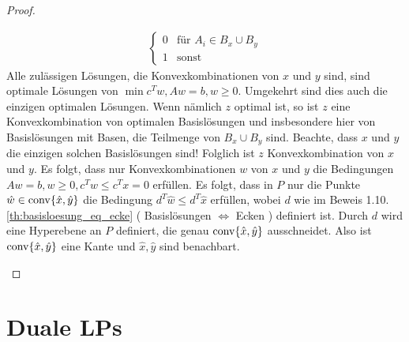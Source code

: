 \begin{proof}
\begin{description}
\begin{align*}
\begin{cases}
0 & \text{für } A_i \in B_x \cup B_y\\
1 & \text{sonst}
\end{cases}
\end{align*} 
Alle zulässigen Lösungen, die Konvexkombinationen von $x$ und $y$ sind, sind optimale Lösungen von $\min c^Tw, Aw=b, w\geq 0$. Umgekehrt sind dies auch die einzigen optimalen Lösungen.
Wenn nämlich $z$ optimal ist, so ist $z$ eine Konvexkombination von optimalen Basislösungen und insbesondere hier von Basislösungen mit Basen, die Teilmenge von $B_x \cup B_y$ sind.
Beachte, dass $x$ und $y$ die einzigen solchen Basislösungen sind!
Folglich ist $z$ Konvexkombination von $x$ und $y$.
Es folgt, dass nur Konvexkombinationen $w$ von $x$ und $y$ die Bedingungen $Aw =b , w\geq 0, c^Tw \leq c^Tx = 0$ erfüllen.
Es folgt, dass in $P$ nur die Punkte $\hat{w} \in \operatorname{conv}\{\hat{x},\hat{y}\}$ die Bedingung $d^T\hat{w} \leq d^T\hat{x}$ erfüllen, wobei $d$ wie im Beweis 1.10. \ref{th:basisloesung_eq_ecke} ( Basislösungen $\Leftrightarrow$ Ecken ) definiert ist.
Durch $d$ wird eine Hyperebene an $P$ definiert, die genau $\operatorname{conv}\{\hat{x},\hat{y}\}$ ausschneidet.
Also ist $\operatorname{conv}\{\hat{x},\hat{y}\}$ eine Kante und $\hat{x},\hat{y}$ sind benachbart.
\end{description}
\end{proof}

\section{Duale LPs}

